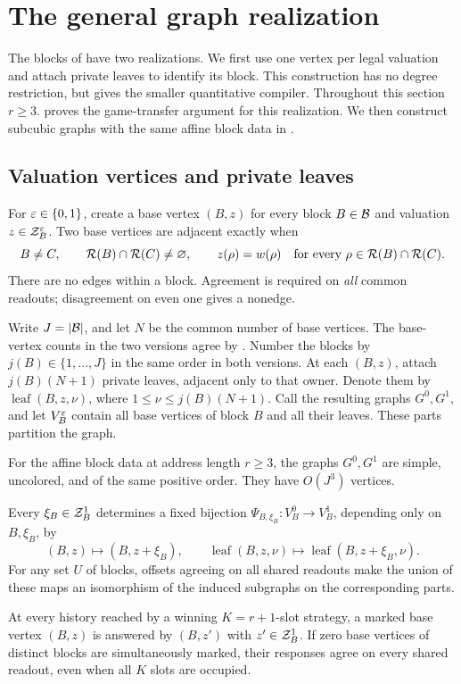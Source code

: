 \section{The general graph realization}\label{general:section}

The blocks of  have two realizations. We first use
one vertex per legal valuation and attach private leaves to identify
its block. This construction has no degree restriction, but gives the
smaller quantitative compiler. Throughout this section \(r\ge3\).
 proves the game-transfer argument for this
realization. We then construct subcubic graphs with the same affine block
data in .

\subsection{Valuation vertices and private leaves}

For \(\varepsilon\in\{0,1\}\), create a base vertex \((B,z)\) for every
block \(B\in\mathcal B\) and valuation \(z\in\mathcal Z_B^\varepsilon\). Two base vertices
are adjacent exactly when
\begin{equation}\label{general:adjacency}
 B\ne C,\qquad
 \mathcal R(B)\cap\mathcal R(C)\ne\varnothing,\qquad
 z(\rho)=w(\rho)\quad
 \text{for every }\rho\in\mathcal R(B)\cap\mathcal R(C).
\end{equation}
There are no edges within a block. Agreement is required on
\emph{all} common readouts; disagreement on even one gives a nonedge.

Write \(J=\lvert\mathcal B\rvert\), and let \(N\) be the common number of base
vertices. The base-vertex counts in the two versions agree by
.
Number the blocks by \(j(B)\in\{1,\ldots,J\}\) in the same order
in both versions. At each \((B,z)\), attach \(j(B)(N+1)\) private
leaves, adjacent only to that owner. Denote them by
\(\operatorname{leaf}(B,z,\nu)\), where
\(1\le\nu\le j(B)(N+1)\). Call the resulting graphs \(G^0,G^1\),
and let \(V_B^\varepsilon\) contain all base vertices of block \(B\) and
all their leaves. These parts partition the graph.

\begin{proposition}\label{prop:general-realization}
For the affine block data at address length \(r\ge3\), the graphs
\(G^0,G^1\) are simple, uncolored, and of the same positive order.
They have \(O(J^3)\) vertices.

Every \(\xi_B\in\mathcal Z_B^1\) determines a fixed bijection
\(\Psi_{B,\xi_B}:V_B^0\to V_B^1\), depending only on \(B,\xi_B\),
by
\[
 (B,z)\longmapsto(B,z+\xi_B),\qquad
 \operatorname{leaf}(B,z,\nu)\longmapsto
 \operatorname{leaf}(B,z+\xi_B,\nu).
\]
For any set \(U\) of blocks, offsets agreeing on all shared readouts
make the union of these maps an isomorphism of the induced subgraphs
on the corresponding parts.

At every history reached by a winning \(K=r+1\)-slot strategy,
a marked base vertex \((B,z)\) is answered by \((B,z')\) with
\(z'\in\mathcal Z_B^1\). If zero base vertices of distinct blocks are
simultaneously marked, their responses agree on every shared
readout, even when all \(K\) slots are occupied.
\end{proposition}

